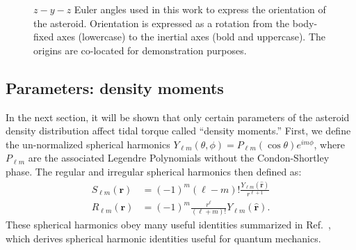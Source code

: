 \documentclass[fleqn,usenatbib]{mnras}
\newcommand{\unit}[1]{\bm{\hat{#1}}}
\begin{document}
\begin{figure}
    \centering
    \caption{$z-y-z$ Euler angles used in this work to express the orientation of the asteroid. Orientation is expressed as a rotation from the body-fixed axes (lowercase) to the inertial axes (bold and uppercase). The origins are co-located for demonstration purposes.}
    \label{fig:euler-angles}
\end{figure}


\subsection{Parameters: density moments}
\label{sec:moments}

In the next section, it will be shown that only certain parameters of the asteroid density distribution affect tidal torque called ``density moments.'' First, we define the un-normalized spherical harmonics $Y_{\ell m}(\theta, \phi) = P_{\ell m}(\cos \theta)e^{im\phi}$, where $P_{\ell m}$ are the associated Legendre Polynomials without the Condon-Shortley phase. The regular and irregular spherical harmonics then defined as:
\begin{equation}
  \begin{split}
    S_{\ell m}(\bm r) &= (-1)^m (\ell - m)! \frac{Y_{\ell m}(\unit r)}{r^{\ell+1}} \\
    R_{\ell m} (\bm r) &= (-1)^m \frac{r^\ell}{(\ell + m)!} Y_{\ell m}(\unit r).
  \end{split}
\end{equation}
These spherical harmonics obey many useful identities summarized in Ref.~\cite{Gelderen1998TheSO}, which derives spherical harmonic identities useful for quantum mechanics.
\end{document}

